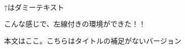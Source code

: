 \documentclass[a4paper, 12pt]{article}
\begin{document}
\setcounter{section}{1}

\begin{definition}[(Matrix)]
\lipsum[2]\\
↑はダミーテキスト
\end{definition}

\noindent こんな感じで、左線付きの環境ができた！！

\begin{definition}
本文はここ。こちらはタイトルの補足がないバージョン
\end{definition}
\end{document}
